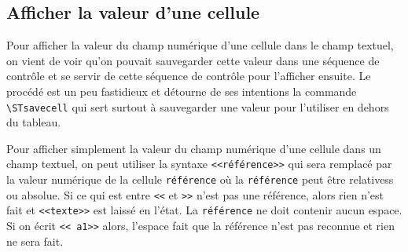 \documentclass[a4paper,10pt]{article}
\newcommand\verbinline[1][]{\lstinline[breaklines=false,basicstyle=\normalsize\ttfamily,#1]}
\begin{document}
\subsection{Afficher la valeur d'une cellule}
Pour afficher la valeur du champ numérique d'une cellule dans le champ textuel, on vient de voir qu'on pouvait sauvegarder cette valeur dans une séquence de contrôle et se servir de cette séquence de contrôle pour l'afficher ensuite. Le procédé est un peu fastidieux et détourne de ses intentions la commande \verbinline-\STsavecell- qui sert surtout à sauvegarder une valeur pour l'utiliser en dehors du tableau.

Pour afficher simplement la valeur du champ numérique d'une cellule dans un champ textuel, on peut utiliser la syntaxe \verb-<<référence>>- qui sera remplacé par la valeur numérique de la cellule \verb-référence- où la \verb-référence- peut être relativess ou absolue. Si ce qui est entre \verb-<<- et \verb->>- n'est pas une référence, alors rien n'est fait et \verb-<<texte>>- est laissé en l'état. La \verb-référence- ne doit contenir aucun espace. Si on écrit \verb-<< a1>>- alors, l'espace fait que la référence n'est pas reconnue et rien ne sera fait.
\end{document}
